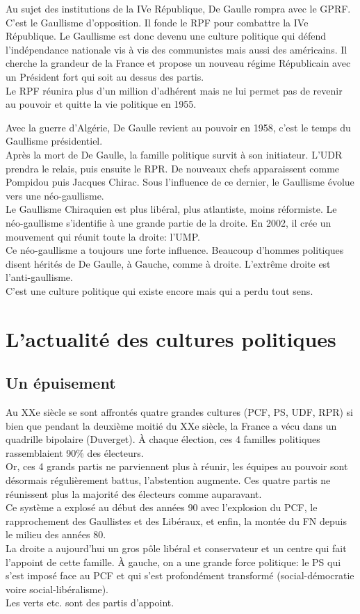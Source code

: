 \documentclass[12pt, a4paper, openany]{book}
\begin{document}
Au sujet des institutions de la IVe République, De Gaulle rompra avec le GPRF. C'est le Gaullisme d'opposition. Il fonde le RPF pour combattre la IVe République. Le Gaullisme est donc devenu une culture politique qui défend l'indépendance nationale vis à vis des communistes mais aussi des américains. Il cherche la grandeur de la France et propose un nouveau régime Républicain avec un Président fort qui soit au dessus des partis. \\
Le RPF réunira plus d'un million d'adhérent mais ne lui permet pas de revenir au pouvoir et quitte la vie politique en 1955.


Avec la guerre d'Algérie, De Gaulle revient au pouvoir en 1958, c'est le temps du Gaullisme présidentiel. \\
Après la mort de De Gaulle, la famille politique survit à son initiateur. L'UDR prendra le relais, puis ensuite le RPR. De nouveaux chefs apparaissent comme Pompidou puis Jacques Chirac. Sous l'influence de ce dernier, le Gaullisme évolue vers une néo-gaullisme. \\
Le Gaullisme Chiraquien est plus libéral, plus atlantiste, moins réformiste. Le néo-gaullisme s'identifie à une grande partie de la droite. En 2002, il crée un mouvement qui réunit toute la droite: l'UMP. \\
Ce néo-gaullisme a toujours une forte influence. Beaucoup d'hommes politiques disent hérités de De Gaulle, à Gauche, comme à droite. L'extrême droite est l'anti-gaullisme. \\
C'est une culture politique qui existe encore mais qui a perdu tout sens. 


\section{L'actualité des cultures politiques}

\subsection{Un épuisement}

Au XXe siècle se sont affrontés quatre grandes cultures (PCF, PS, UDF, RPR) si bien que pendant la deuxième moitié du XXe siècle, la France a vécu dans un quadrille bipolaire (Duverget). À chaque élection, ces 4 familles politiques rassemblaient 90\% des électeurs. \\
Or, ces 4 grands partis ne parviennent plus à réunir, les équipes au pouvoir sont désormais régulièrement battus, l'abstention augmente. Ces quatre partis  ne réunissent plus la majorité des électeurs comme auparavant. \\
Ce système a explosé au début des années 90 avec l'explosion du PCF, le rapprochement des Gaullistes et des Libéraux, et enfin, la montée du FN depuis le milieu des années 80. \\
La droite a aujourd'hui un gros pôle libéral et conservateur et un centre qui fait l'appoint de cette famille. À gauche, on a une grande force politique: le PS qui s'est imposé face au PCF et qui s'est profondément transformé (social-démocratie voire social-libéralisme). \\
Les verts etc. sont des partis d'appoint.
\end{document}
